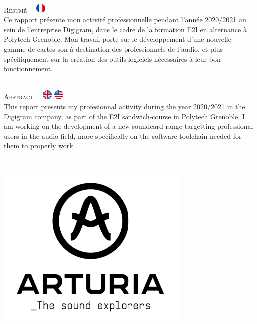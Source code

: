 
\thispagestyle{empty}
\cleartoevenpage
\thispagestyle{empty}

\ \vfill

{\huge\textsc{Résumé}}
\ \
\includegraphics[width=18px]{logos/france}
\ \\

Ce rapport présente mon activité professionnelle pendant l'année 2020/2021 au
sein de l'entreprise Digigram, dans le cadre de la formation E2I en alternance à
Polytech Grenoble. Mon travail porte sur le développement d'une nouvelle gamme
de cartes son à destination des professionnels de l'audio, et plus
spécifiquement sur la création des outils logiciels nécessaires à leur bon
fonctionnement.

\ \\

{\huge\textsc{Abstract}}
\ \
\includegraphics[width=18px]{logos/united-kingdom}
\includegraphics[width=18px]{logos/united-states}
\ \\


This report presents my profesionnal activity during the year 2020/2021 in the
Digigram company, as part of the E2I sandwich-course in Polytech Grenoble. I am
working on the development of a new soundcard range targetting professional
users in the audio field, more specifically on the software toolchain needed for
them to properly work.

\ \\

\begin{center}
    \includegraphics[width=0.7\textwidth]{logos/arturia.png}
\end{center}

\vfill